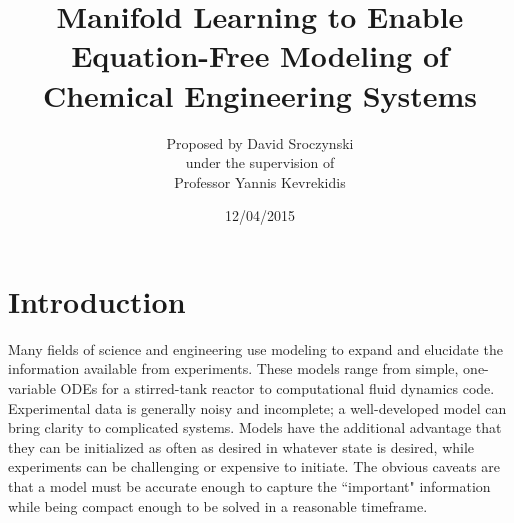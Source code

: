 \documentclass[12pt]{article}
\begin{document}
\title{Manifold Learning to Enable Equation-Free Modeling of Chemical Engineering Systems}
\author{\LARGE Proposed by David Sroczynski\vspace{3mm}\\\Large under the supervision of\vspace{3mm}\\\LARGE Professor Yannis Kevrekidis}
\date{12/04/2015}
\maketitle
\thispagestyle{empty}
\clearpage
\tableofcontents
\thispagestyle{empty}
\clearpage
{}
\section{Introduction}
Many fields of science and engineering use modeling to expand and elucidate the information available from experiments. These models range from simple, one-variable ODEs for a stirred-tank reactor to computational fluid dynamics code. Experimental data is generally noisy and incomplete; a well-developed model can bring clarity to complicated systems. Models have the additional advantage that they can be initialized as often as desired in whatever state is desired, while experiments can be challenging or expensive to initiate. The obvious caveats are that a model must be accurate enough to capture the ``important" information while being compact enough to be solved in a reasonable timeframe.  \vspace{1mm}
\end{document}
